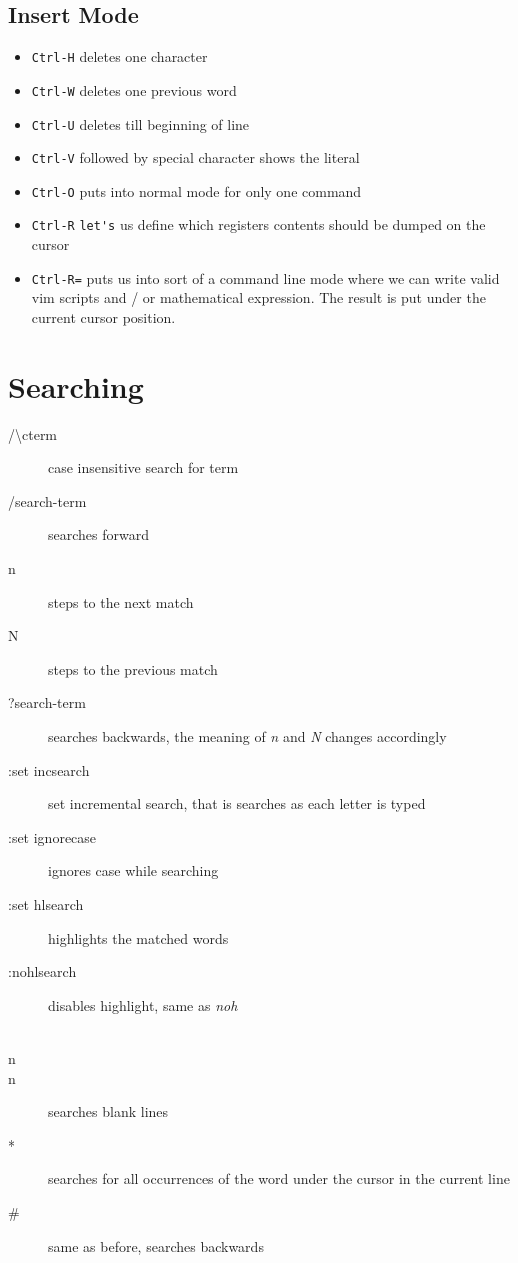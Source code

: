 \documentclass[a4paper, 12pt]{article}
\begin{document}
\subsection{Insert Mode}
\begin{itemize}
	\item \verb|Ctrl-H| deletes one character
	\item \verb|Ctrl-W| deletes one previous word
	\item \verb|Ctrl-U| deletes till beginning of line
	\item \verb|Ctrl-V| followed by special character shows the literal
	\item \verb|Ctrl-O| puts into normal mode for only one command 
	\item \verb|Ctrl-R| \verb|let's| us define which registers contents should be dumped on the cursor 
	\item \verb|Ctrl-R=| puts us into sort of a command line mode where we can write valid vim scripts and / or mathematical expression. The result is put under the current cursor position.
\end{itemize}

\section{Searching}
\begin{description}
	\item[/\textbackslash cterm] case insensitive search for term
	\item[/search-term] searches forward
	\item[n] steps to the next match
	\item[N] steps to the previous match
	\item[?search-term] searches backwards, the meaning of \emph{n} and \emph{N} changes accordingly
	\item[:set incsearch] set incremental search, that is searches as each letter is typed
	\item[:set ignorecase] ignores case while searching
	\item[:set hlsearch] highlights the matched words
	\item[:nohlsearch] disables highlight, same as \emph{noh}
	\item[\\n\\n] searches blank lines
	\item[*] searches for all occurrences of the word under the cursor in the current line
	\item[#] same as before, searches backwards
\end{description}
\end{document}
